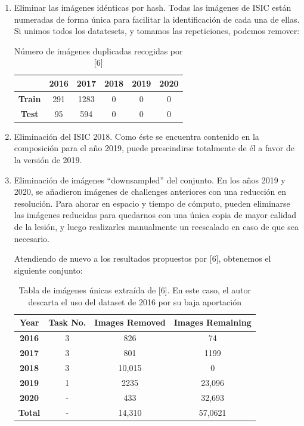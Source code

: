 \begin{enumerate}
	
	
	\item Eliminar las imágenes idénticas por hash. Todas las imágenes de ISIC están numeradas de forma única para facilitar la identificación de cada una de ellas. Si unimos todos los datatesets, y tomamos las repeticiones, podemos remover:
	
	\begin{table}[H]
		\centering
		\begin{tabular}{|c|c|c|c|c|c|}
			\hline
			\textbf{} & \textbf{2016} & \textbf{2017} & \textbf{2018} & \textbf{2019} & \textbf{2020} \\ \hline
			\textbf{Train} & 291 & 1283 & 0 & 0 & 0 \\ \hline
			\textbf{Test} & 95 & 594 & 0 & 0 & 0 \\ \hline
		\end{tabular}
		\caption{Número de imágenes duplicadas recogidas por [6]}
	\end{table}
	
	
	\item 	Eliminación del ISIC 2018. Como éste se encuentra contenido en la composición para el año 2019, puede prescindirse totalmente de él a favor de la versión de 2019.
	\item 	Eliminación de imágenes “downsampled” del conjunto. En los años 2019 y 2020, se añadieron imágenes de challenges anteriores con una reducción en resolución. Para ahorar en espacio y tiempo de cómputo, pueden eliminarse las imágenes reducidas para quedarnos con una única copia de mayor calidad de la lesión, y luego realizarles manualmente un reescalado en caso de que sea necesario.
	
	Atendiendo de nuevo a los resultados propuestos por [6], obtenemos el siguiente conjunto: 
	
	\begin{table}[H]
		\centering
		\begin{tabular}{|c|c|c|c|}
			\hline
			\textbf{Year} & \textbf{Task No.} & \textbf{Images Removed} & \textbf{Images Remaining} \\ \hline
			\textbf{2016} & 3 & 826 & 74 \\ \hline
			\textbf{2017} & 3 & 801 & 1199 \\ \hline
			\textbf{2018} & 3 & 10,015 & 0 \\ \hline
			\textbf{2019} & 1 & 2235 & 23,096 \\ \hline
			\textbf{2020} & - & 433 & 32,693 \\ \hline
			\textbf{Total} & - & 14,310 & 57,0621 \\ \hline
		\end{tabular}
		\caption{Tabla de imágenes únicas extraída de [6]. En este caso, el autor descarta el uso del dataset de 2016 por su baja aportación}
	\end{table}
	
\end{enumerate}

